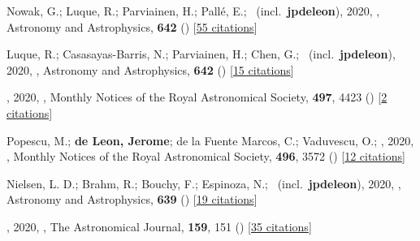 \item[{\color{numcolor}\scriptsize30}] Nowak, G.; Luque, R.; Parviainen, H.; Pall{\'e}, E.; \etal\ (incl.\ \textbf{jpdeleon}), 2020, , Astronomy and Astrophysics, \textbf{642} () [\href{https://ui.adsabs.harvard.edu/abs/2020A&A...642A.173N}{55 citations}]

\item[{\color{numcolor}\scriptsize29}] Luque, R.; Casasayas-Barris, N.; Parviainen, H.; Chen, G.; \etal\ (incl.\ \textbf{jpdeleon}), 2020, , Astronomy and Astrophysics, \textbf{642} () [\href{https://ui.adsabs.harvard.edu/abs/2020A&A...642A..50L}{15 citations}]

\item[{\color{numcolor}\scriptsize28}] , 2020, , Monthly Notices of the Royal Astronomical Society, \textbf{497}, 4423 () [\href{https://ui.adsabs.harvard.edu/abs/2020MNRAS.497.4423N}{2 citations}]

\item[{\color{numcolor}\scriptsize27}] Popescu, M.; \textbf{de Leon, Jerome}; de la Fuente Marcos, C.; Vaduvescu, O.; \etal, 2020, , Monthly Notices of the Royal Astronomical Society, \textbf{496}, 3572 () [\href{https://ui.adsabs.harvard.edu/abs/2020MNRAS.496.3572P}{12 citations}]

\item[{\color{numcolor}\scriptsize26}] Nielsen, L. D.; Brahm, R.; Bouchy, F.; Espinoza, N.; \etal\ (incl.\ \textbf{jpdeleon}), 2020, , Astronomy and Astrophysics, \textbf{639} () [\href{https://ui.adsabs.harvard.edu/abs/2020A&A...639A..76N}{19 citations}]

\item[{\color{numcolor}\scriptsize25}] , 2020, , The Astronomical Journal, \textbf{159}, 151 () [\href{https://ui.adsabs.harvard.edu/abs/2020AJ....159..151S}{35 citations}]

